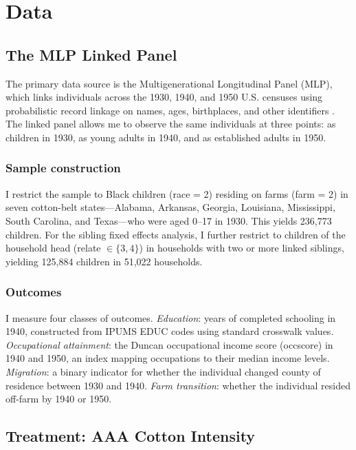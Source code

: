 \documentclass[12pt]{article}
\begin{document}
\section{Data}

\subsection{The MLP Linked Panel}

The primary data source is the Multigenerational Longitudinal Panel (MLP), which links individuals across the 1930, 1940, and 1950 U.S. censuses using probabilistic record linkage on names, ages, birthplaces, and other identifiers \citep{abramitzky2021automated}. The linked panel allows me to observe the same individuals at three points: as children in 1930, as young adults in 1940, and as established adults in 1950.

\subsubsection*{Sample construction} I restrict the sample to Black children (race = 2) residing on farms (farm = 2) in seven cotton-belt states---Alabama, Arkansas, Georgia, Louisiana, Mississippi, South Carolina, and Texas---who were aged 0--17 in 1930. This yields 236,773 children. For the sibling fixed effects analysis, I further restrict to children of the household head (relate $\in \{3, 4\}$) in households with two or more linked siblings, yielding 125,884 children in 51,022 households.

\subsubsection*{Outcomes} I measure four classes of outcomes. \textit{Education}: years of completed schooling in 1940, constructed from IPUMS EDUC codes using standard crosswalk values. \textit{Occupational attainment}: the Duncan occupational income score (occscore) in 1940 and 1950, an index mapping occupations to their median income levels. \textit{Migration}: a binary indicator for whether the individual changed county of residence between 1930 and 1940. \textit{Farm transition}: whether the individual resided off-farm by 1940 or 1950.

\subsection{Treatment: AAA Cotton Intensity}
\end{document}

